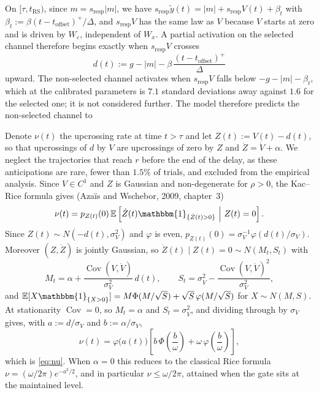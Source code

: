 \documentclass[a4paper,11pt]{article}
\newcommand{\E}{\mathbb E}
\newcommand{\Cov}{\operatorname{Cov}}
\newcommand{\1}{\mathbbm{1}}
\newcommand{\toff}{t_{\mathrm{offset}}}
\newcommand{\trs}{t_{\mathrm{RS}}}
\newcommand{\sresp}{s_{\mathrm{resp}}}
\begin{document}
On $[\tau,\trs)$, since $m=\sresp|m|$, we have
$\sresp\tilde y(t)=|m|+\sresp V(t)+\beta_t$ with
$\beta_t:=\beta(t-\toff)^{+}/\Delta$, and $\sresp V$ has the same law as $V$ because $V$
starts at zero and is driven by $W_\varepsilon$, independent of $W_x$. A partial
activation on the selected channel therefore begins exactly when $\sresp V$ crosses
\begin{equation}
d(t):=g-|m|-\beta\,\frac{(t-\toff)^{+}}{\Delta}
\end{equation}
upward. The non-selected channel activates when $\sresp V$ falls below
$-g-|m|-\beta_t$, which at the calibrated parameters is $7.1$ standard deviations away
against $1.6$ for the selected one; it is not considered further. The model therefore predicts the non-selected channel to


Denote $\nu(t)$ the upcrossing rate at time $t>\tau$ and let $Z(t):=V(t)-d(t)$, so that
upcrossings of $d$ by $V$ are upcrossings of zero by $Z$ and
$\dot Z=\dot V+\alpha$. We neglect the trajectories that reach $r$ before the end of the
delay, as these anticipations are rare, fewer than $1.5\%$ of trials, and excluded from
the empirical analysis. Since $V\in C^{1}$ and $Z$ is Gaussian and non-degenerate for
$\rho>0$, the Kac--Rice formula gives (Aza\"is and Wschebor, 2009, chapter~3)
\begin{equation}\label{eq:KR1}
\nu(t)=p_{Z(t)}(0)\,\E\left[\dot Z(t)\1_{\{\dot Z(t)>0\}}\ \middle|\ Z(t)=0\right].
\end{equation}
Since $Z(t)\sim N(-d(t),\sigma_{V}^{2})$ and $\varphi$ is even,
$p_{Z(t)}(0)=\sigma_{V}^{-1}\varphi(d(t)/\sigma_{V})$. Moreover $(Z,\dot Z)$ is jointly
Gaussian, so $\dot Z(t)\mid Z(t)=0\sim N(M_t,S_t)$ with
\begin{equation}
M_t=\alpha+\frac{\Cov(V,\dot V)}{\sigma_{V}^{2}}\,d(t),
\qquad
S_t=\sigma_{\dot V}^{2}-\frac{\Cov(V,\dot V)^{2}}{\sigma_{V}^{2}},
\end{equation}
and $\E[X\1_{\{X>0\}}]=M\Phi(M/\sqrt S)+\sqrt S\,\varphi(M/\sqrt S)$ for
$X\sim N(M,S)$. At stationarity $\Cov=0$, so $M_t=\alpha$ and $S_t=\sigma_{\dot V}^{2}$,
and dividing through by $\sigma_V$ gives, with $a:=d/\sigma_V$ and $b:=\alpha/\sigma_V$,
\begin{equation}\label{eq:KR2}
\nu(t)=\varphi\bigl(a(t)\bigr)
\left[b\,\Phi\!\left(\frac{b}{\omega}\right)
+\omega\,\varphi\!\left(\frac{b}{\omega}\right)\right],
\end{equation}
which is \eqref{eq:nu}. When $\alpha=0$ this reduces to the classical Rice formula
$\nu=(\omega/2\pi)e^{-a^{2}/2}$, and in particular $\nu\le\omega/2\pi$, attained when the
gate sits at the maintained level.
\end{document}
